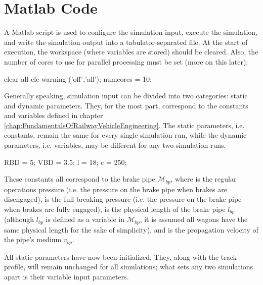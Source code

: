 \section{Matlab Code}
\label{sec:MatlabCode}
\par\noindent
A Matlab script is used to configure the simulation input, execute the simulation, and write the simulation output into a tabulator-separated file. At the start of execution, the workspace (where variables are stored) should be cleared. Also, the number of cores to use for parallel processing must be set (more on this later):

\bigskip
\begin{python}
clear all
clc
warning ('off','all');
numcores = 10;
\end{python}
\bigskip

\noindent
Generally speaking, simulation input can be divided into two categories: static and dynamic parameters. They, for the most part, correspond to the constants and variables defined in chapter \ref{chap:FundamentalsOfRailwayVehicleEngineering}. The static parameters, i.e. constants, remain the same for every single simulation run, while the dynamic parameters, i.e. variables, may be different for any two simulation runs.

\bigskip
\begin{python}
RBD = 5; 
VBD = 3.5; 
l = 18; 
c = 250; 
\end{python}
\bigskip

\noindent
These constants all correspond to the brake pipe ${\mathcal{M}}_{bp}$, where  is the regular operations pressure (i.e. the pressure on the brake pipe when brakes are disengaged),  is the full breaking pressure (i.e. the pressure on the brake pipe when brakes are fully engaged),  is the physical length of the brake pipe $l_{bp}$ (although $l_{bp}$ is defined as a variable in ${\mathcal{M}}_{bp}$, it is assumed all wagons have the same physical length for the sake of simplicity), and  is the propagation velocity of the pipe's medium $v_{bp}$.

%
%
%
\par\noindent
All static parameters have now been initialized. They, along with the track profile, will remain unchanged for all simulations; what sets any two simulations apart is their variable input parameters.

